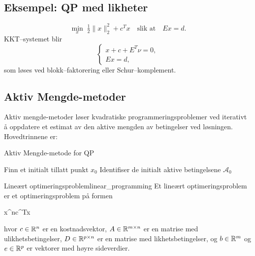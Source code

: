 \subsection{Eksempel: QP med likheter}
\[
	\min_x\;\tfrac12\|x\|_2^2 + c^T x
	\quad\text{slik at}\quad
	E x = d.
\]
KKT--systemet blir
\[
	\begin{cases}
		x + c + E^T\nu = 0, \\
		E x = d,
	\end{cases}
\]
som løses ved blokk--faktorering eller Schur--komplement.

\bigskip

\subsection{Aktiv Mengde-metoder}
Aktiv mengde-metoder løser kvadratiske programmeringsproblemer ved iterativt å oppdatere et estimat av den aktive mengden av betingelser ved løsningen. Hovedtrinnene er:

\begin{algorithm}[H]
	\caption{Aktiv Mengde-metode for QP}
	Finn et initialt tillatt punkt \( x_0 \)\;
	Identifiser de initialt aktive betingelsene \( \mathcal{A}_0 \)\;
\end{algorithm}

\begin{definition}{Lineært optimeringsproblem}{linear_programming}
	Et lineært optimeringsproblem er et optimeringsproblem på formen
	\begin{mini*}
		{x\in\R^n}{c^Tx}{}{}
	\end{mini*}
	hvor \(c \in \mathbb{R}^n\) er en kostnadsvektor, \(A \in \mathbb{R}^{m \times n}\) er en matrise med ulikhetsbetingelser, \(D \in \mathbb{R}^{p \times n}\) er en matrise med likhetsbetingelser, og \(b \in \mathbb{R}^m\) og \(e \in \mathbb{R}^p\) er vektorer med høyre sideverdier.
\end{definition}

